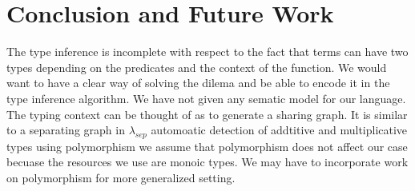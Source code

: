 \chapter{Conclusion and Future Work}\label{chp:conclusion}

The \qub{} type inference is incomplete with respect to the fact that terms can have two types depending
on the predicates and the context of the function. We would want to have a clear way of solving
the dilema and be able to encode it in the type inference algorithm.
We have not given any sematic model for our language. The typing context can be thought
of as to generate a sharing graph. It is similar to a separating graph in $\lambda_{sep}$ \citep{atkey_lambda_sep_2004}
automoatic detection of  addtitive and multiplicative types using polymorphism
we assume that polymorphism does not affect our case becuase the resources we use
are monoic types. We may have to incorporate work on polymorphism \cite{collinson_bunched_2005} for
more generalized setting.